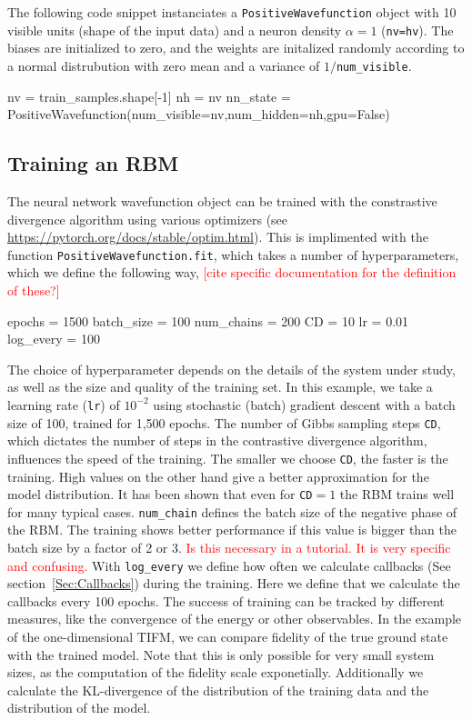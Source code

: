 \documentclass[submission, Phys]{SciPost}
\begin{document}
The following code snippet instanciates a \verb|PositiveWavefunction| object with 10 visible units (shape of the input data) and a neuron density $\alpha=1$ (\verb|nv=hv|).
The biases are initialized to zero, and the weights are initalized randomly according to a normal distrubution with zero mean and a variance of $1/$\verb|num_visible|.

\begin{python}
nv = train_samples.shape[-1]
nh = nv
nn_state = PositiveWavefunction(num_visible=nv,num_hidden=nh,gpu=False)
\end{python}

\subsection{Training an RBM}

The neural network wavefunction object can be trained with the constrastive divergence algorithm using various optimizers (see \url{https://pytorch.org/docs/stable/optim.html}).
This is implimented with the function \verb|PositiveWavefunction.fit|, which takes a number of hyperparameters, which we define the following way, 
\textcolor{red}{[cite specific documentation for the definition of these?]}

\begin{python}
epochs     = 1500
batch_size = 100
num_chains = 200
CD         = 10
lr         = 0.01
log_every  = 100
\end{python}
The choice of hyperparameter depends on the details of the system under study, as well as the size and quality of the training set.
In this example, we take a learning rate (\verb|lr|) of $10^{-2}$ using stochastic (batch) gradient descent with a batch size of 100, trained for 1,500 epochs.
The number of Gibbs sampling steps \verb|CD|, which dictates the number of steps in the contrastive divergence algorithm,
influences the speed of the training. The smaller we choose \verb|CD|, the faster is the training. High values on the other hand give a better approximation for the model distribution. It has been shown that even for \verb|CD|$=1$ the RBM trains well for many typical cases\cite{hinton2002training}. \verb|num_chain| defines the batch size of the negative phase of the RBM. The training shows better performance if this value is bigger than the batch size by a factor of 2 or 3. \textcolor{red}{Is this necessary in a tutorial. It is very specific and confusing.} With \verb|log_every| we define how often we calculate callbacks (See section~\ref{Sec:Callbacks}) during the training. Here we define that we calculate the callbacks every 100 epochs.
The success of training can be tracked by different measures, like the convergence of the energy or other observables.
In the example of the one-dimensional TIFM, we can compare fidelity of the true ground state with the trained model.
Note that this is only possible for very small system sizes, as the computation of the fidelity scale exponetially. Additionally we calculate the KL-divergence of the distribution of the training data and the distribution of the model.
\end{document}
